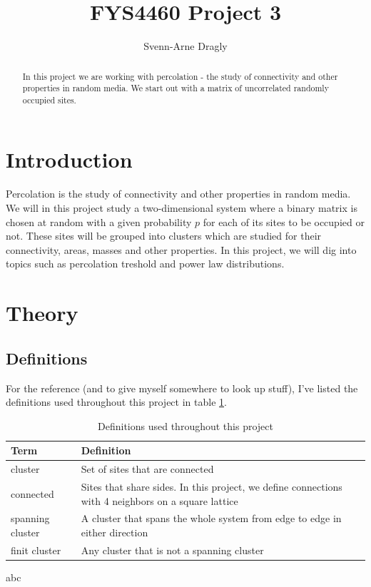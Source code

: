 \documentclass[a4paper,reprint,floatfix,amsmath,amssymb,aps,pra]{revtex4-1}
\begin{document}
\title{FYS4460 Project 3}
\author{Svenn-Arne Dragly}

\begin{abstract}
In this project we are working with percolation - the study of connectivity and other properties in random media. We start out with a matrix of uncorrelated randomly occupied sites.
\end{abstract}

\maketitle

\section{Introduction}

Percolation is the study of connectivity and other properties in random media. We will in this project study a two-dimensional system where a binary matrix is chosen at random with a given probability $p$ for each of its sites to be occupied or not. These sites will be grouped into clusters which are studied for their connectivity, areas, masses and other properties. In this project, we will dig into topics such as percolation treshold and power law distributions.

\section{Theory}

\subsection{Definitions}

For the reference (and to give myself somewhere to look up stuff), I've listed the definitions used throughout this project in table \ref{tab:definitions}.
\begingroup
\begin{table}[ht]
\setlength\extrarowheight{4pt} %
\begin{ruledtabular}
\begin{tabular}{l p{}}
Term       &                  Definition \\
\hline
cluster & Set of sites that are connected \\
connected & Sites that share sides. In this project, we define connections with 4 neighbors on a square lattice \\
spanning cluster & A cluster that spans the whole system from edge to edge in either direction \\
finit cluster & Any cluster that is not a spanning cluster \\
\end{tabular}
\end{ruledtabular}
\caption{Definitions used throughout this project}
\label{tab:definitions}
\end{table}
\endgroup
\begin{table}
abc
\end{table}
\end{document}
